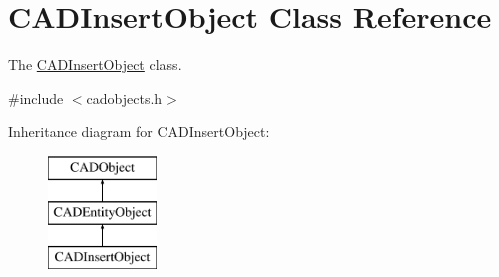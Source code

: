 \hypertarget{class_c_a_d_insert_object}{}\section{C\+A\+D\+Insert\+Object Class Reference}
\label{class_c_a_d_insert_object}


The \hyperlink{class_c_a_d_insert_object}{C\+A\+D\+Insert\+Object} class.  




{\ttfamily \#include $<$cadobjects.\+h$>$}

Inheritance diagram for C\+A\+D\+Insert\+Object\+:\begin{figure}[H]
\begin{center}
\leavevmode
\includegraphics[height=3.000000cm]{class_c_a_d_insert_object}
\end{center}
\end{figure}

